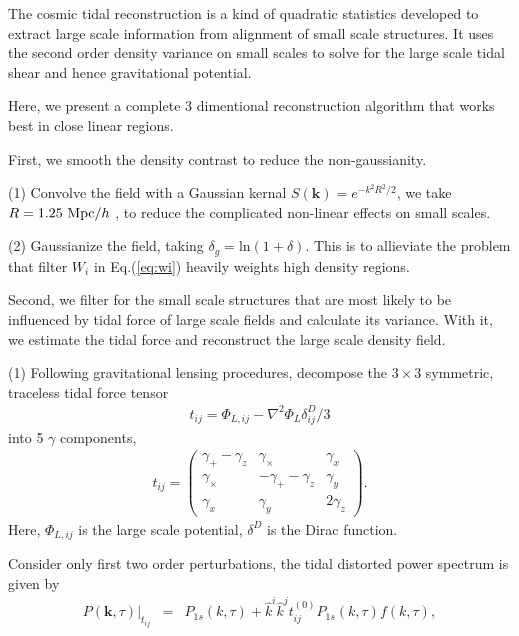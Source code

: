 The cosmic tidal reconstruction is a kind of quadratic statistics developed to extract large scale information from alignment of small scale structures.
It uses the second order density variance on small scales to solve for the large scale tidal shear and hence gravitational potential.

Here, we present a complete 3 dimentional reconstruction algorithm that works best in close linear regions.

First, we smooth the density contrast to reduce the non-gaussianity.

(1) Convolve the field with a Gaussian kernal
$S(\bm{k})=e^{-k^2R^2/2}$, 
we take $R=1.25\ \mathrm{Mpc}/h$ \cite{2012:pen},
to reduce the complicated non-linear effects on small scales.

(2) Gaussianize the field, taking 
$\delta_g=\mathrm{ln}(1+\delta)$. 
This is to allieviate the problem that filter $W_i$ in Eq.(\ref{eq:wi}) heavily weights high density regions.


Second, we filter for the small scale structures that are most likely to be influenced by tidal force of large scale fields and calculate its variance. 
With it, we estimate the tidal force and reconstruct the large scale density field.

(1) Following gravitational lensing procedures, decompose the $3\times3$ symmetric, traceless tidal force tensor 
\begin{eqnarray}
\label{eq:tij}
t_{ij}=\Phi_{L,ij}-\nabla^2\Phi_L\delta^D_{ij}/3
\end{eqnarray}
into 5 $\gamma$ components, 
\begin{eqnarray}
t_{ij}=\left( \begin{array}{ccc}
\gamma_{+}-\gamma_{z} & \gamma_{\times} & \gamma_{x}\\
\gamma_{\times} & -\gamma_{+}-\gamma_{z} & \gamma_{y}\\
\gamma_{x} & \gamma_{y} & 2\gamma_z
\end{array} \right).
\end{eqnarray}
Here, $\Phi_{L,ij}$ is the large scale potential, 
$\delta^D$ is the Dirac function.

Consider only first two order perturbations, 
the tidal distorted power spectrum \cite{2015:zhu} is given by
\begin{eqnarray}
\label{eq:powerdistort}
P(\bm{k},\tau)|_{t_{ij}}&=&P_{1s}(k,\tau)+
\hat{k}^i\hat{k}^jt_{ij}^{(0)}P_{1s}(k,\tau)f(k,\tau),
\end{eqnarray}

